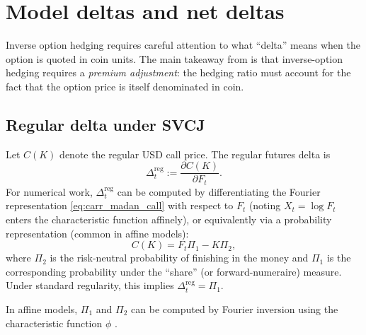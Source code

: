 \documentclass[a4paper,titlepage,12pt]{report}
\theoremstyle{plain}
\begin{document}
\section{Model deltas and net deltas}
\label{sec:deltas}

Inverse option hedging requires careful attention to what ``delta'' means when the option is quoted in coin units. The main takeaway from \citet{LucicSepp2024} is that inverse-option hedging requires a \emph{premium adjustment}: the hedging ratio must account for the fact that the option price is itself denominated in coin.

\subsection{Regular delta under SVCJ}
\label{subsec:regular_delta}

Let $C(K)$ denote the regular USD call price. The regular futures delta is
\begin{equation}
\Delta^{\mathrm{reg}}_t := \frac{\partial C(K)}{\partial F_t}.
\end{equation}
For numerical work, $\Delta^{\mathrm{reg}}_t$ can be computed by differentiating the Fourier representation \eqref{eq:carr_madan_call} with respect to $F_t$ (noting $X_t=\log F_t$ enters the characteristic function affinely), or equivalently via a probability representation (common in affine models):
\begin{equation}
C(K) = F_t \Pi_1 - K \Pi_2,
\end{equation}
where $\Pi_2$ is the risk-neutral probability of finishing in the money and $\Pi_1$ is the corresponding probability under the ``share'' (or forward-numeraire) measure. Under standard regularity, this implies $\Delta^{\mathrm{reg}}_t=\Pi_1$.

In affine models, $\Pi_1$ and $\Pi_2$ can be computed by Fourier inversion using the characteristic function $\phi$ \citep{GilPelaez1951, Heston1993}.


\end{document}
